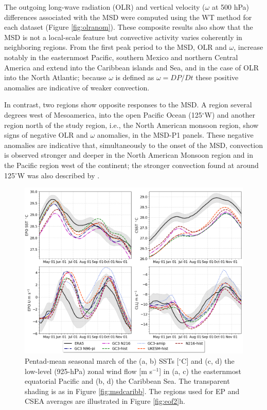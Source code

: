  The outgoing long-wave radiation (OLR) and vertical velocity ($\omega$ at 500 hPa) differences associated with the MSD were computed using the WT method for each dataset (Figure \ref{fig:olranom}). These composite results also show that the MSD is not a local-scale feature but convective activity varies coherently in neighboring regions. From the first peak period to the MSD, OLR and $\omega$, increase notably in the easternmost Pacific, southern Mexico and northern Central America and extend into the Caribbean islands and Sea, and in the case of OLR into the North Atlantic; because $\omega$ is defined as $\omega=DP/Dt$  these positive anomalies are indicative of weaker convection. 
 
 In contrast, two regions show opposite responses to the MSD. A region several degrees west of Mesoamerica, into the open Pacific Ocean (125$^\circ$W) and another region north of the study region, i.e., the North American monsoon region, show signs of negative OLR and $\omega$ anomalies, in the MSD-P1 panels. These negative anomalies are indicative that, simultaneously to the onset of the MSD,  convection is observed stronger and deeper in the North American Monsoon region and in the Pacific region west of the continent; the stronger convection found at around 125$^\circ$W was also described by \cite{herrera2015}. 
 
 \begin{figure}[t!]
\includegraphics[width=\linewidth]{figures/index_seasonal}
\caption[Seasonal cycle of East Pacific and Caribbean SSTs and zonal winds.]{Pentad-mean seasonal march of the (a, b) SSTs [$^\circ$C] and (c, d) the low-level (925-hPa) zonal wind flow [m s$^{-1}$] in (a, c) the easternmost equatorial Pacific and (b, d) the Caribbean Sea. The transparent shading is as in Figure \ref{fig:msdcaribb}. The regions used for EP and CSEA averages are illustrated in Figure \ref{fig:eof2}h.}
\label{fig:csst}
\end{figure}
 
